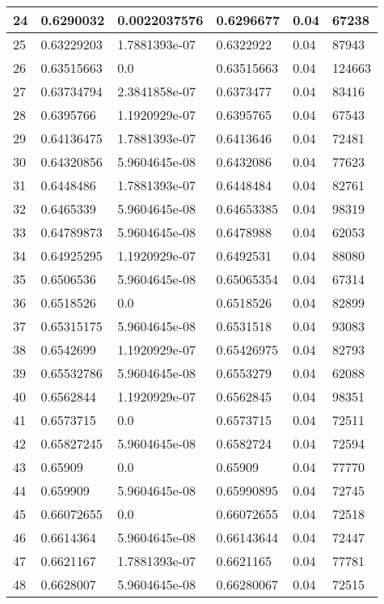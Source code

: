 \begin{longtable}{|l|l|l|l|l|l|}
24 & 0.6290032 & 0.0022037576 & 0.6296677 & 0.04 & 67238 \\ \hline 
25 & 0.63229203 & 1.7881393e-07 & 0.6322922 & 0.04 & 87943 \\ \hline 
26 & 0.63515663 & 0.0 & 0.63515663 & 0.04 & 124663 \\ \hline 
27 & 0.63734794 & 2.3841858e-07 & 0.6373477 & 0.04 & 83416 \\ \hline 
28 & 0.6395766 & 1.1920929e-07 & 0.6395765 & 0.04 & 67543 \\ \hline 
29 & 0.64136475 & 1.7881393e-07 & 0.6413646 & 0.04 & 72481 \\ \hline 
30 & 0.64320856 & 5.9604645e-08 & 0.6432086 & 0.04 & 77623 \\ \hline 
31 & 0.6448486 & 1.7881393e-07 & 0.6448484 & 0.04 & 82761 \\ \hline 
32 & 0.6465339 & 5.9604645e-08 & 0.64653385 & 0.04 & 98319 \\ \hline 
33 & 0.64789873 & 5.9604645e-08 & 0.6478988 & 0.04 & 62053 \\ \hline 
34 & 0.64925295 & 1.1920929e-07 & 0.6492531 & 0.04 & 88080 \\ \hline 
35 & 0.6506536 & 5.9604645e-08 & 0.65065354 & 0.04 & 67314 \\ \hline 
36 & 0.6518526 & 0.0 & 0.6518526 & 0.04 & 82899 \\ \hline 
37 & 0.65315175 & 5.9604645e-08 & 0.6531518 & 0.04 & 93083 \\ \hline 
38 & 0.6542699 & 1.1920929e-07 & 0.65426975 & 0.04 & 82793 \\ \hline 
39 & 0.65532786 & 5.9604645e-08 & 0.6553279 & 0.04 & 62088 \\ \hline 
40 & 0.6562844 & 1.1920929e-07 & 0.6562845 & 0.04 & 98351 \\ \hline 
41 & 0.6573715 & 0.0 & 0.6573715 & 0.04 & 72511 \\ \hline 
42 & 0.65827245 & 5.9604645e-08 & 0.6582724 & 0.04 & 72594 \\ \hline 
43 & 0.65909 & 0.0 & 0.65909 & 0.04 & 77770 \\ \hline 
44 & 0.659909 & 5.9604645e-08 & 0.65990895 & 0.04 & 72745 \\ \hline 
45 & 0.66072655 & 0.0 & 0.66072655 & 0.04 & 72518 \\ \hline 
46 & 0.6614364 & 5.9604645e-08 & 0.66143644 & 0.04 & 72447 \\ \hline 
47 & 0.6621167 & 1.7881393e-07 & 0.6621165 & 0.04 & 77781 \\ \hline 
48 & 0.6628007 & 5.9604645e-08 & 0.66280067 & 0.04 & 72515 \\ \hline 

\end{longtable}
